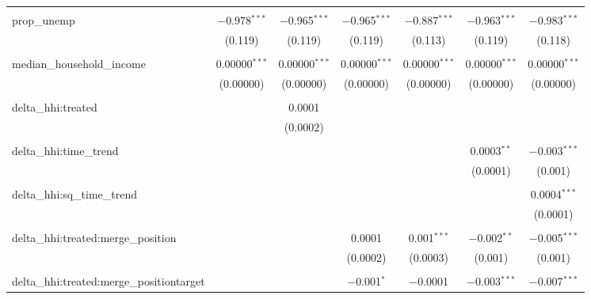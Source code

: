 \begin{table}[H]
{\begin{tabular}{@{\extracolsep{5pt}}lcccccc}
   & & & & & & \\  

  prop\_unemp & $-$0.978$^{***}$ & $-$0.965$^{***}$ & $-$0.965$^{***}$ & $-$0.887$^{***}$ & $-$0.963$^{***}$ & $-$0.983$^{***}$ \\  

   & (0.119) & (0.119) & (0.119) & (0.113) & (0.119) & (0.118) \\  

   & & & & & & \\  

  median\_household\_income & 0.00000$^{***}$ & 0.00000$^{***}$ & 0.00000$^{***}$ & 0.00000$^{***}$ & 0.00000$^{***}$ & 0.00000$^{***}$ \\  

   & (0.00000) & (0.00000) & (0.00000) & (0.00000) & (0.00000) & (0.00000) \\  

   & & & & & & \\  

  delta\_hhi:treated &  & 0.0001 &  &  &  &  \\  

   &  & (0.0002) &  &  &  &  \\  

   & & & & & & \\  

  delta\_hhi:time\_trend &  &  &  &  & 0.0003$^{**}$ & $-$0.003$^{***}$ \\  

   &  &  &  &  & (0.0001) & (0.001) \\  

   & & & & & & \\  

  delta\_hhi:sq\_time\_trend &  &  &  &  &  & 0.0004$^{***}$ \\  

   &  &  &  &  &  & (0.0001) \\  

   & & & & & & \\  

  delta\_hhi:treated:merge\_position &  &  & 0.0001 & 0.001$^{***}$ & $-$0.002$^{**}$ & $-$0.005$^{***}$ \\  

   &  &  & (0.0002) & (0.0003) & (0.001) & (0.001) \\  

   & & & & & & \\  

  delta\_hhi:treated:merge\_positiontarget &  &  & $-$0.001$^{*}$ & $-$0.0001 & $-$0.003$^{***}$ & $-$0.007$^{***}$ \\  


\end{tabular}}
\end{table}
